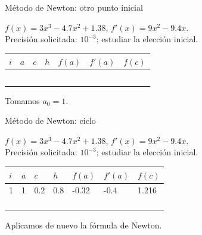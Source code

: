 \documentclass[main.tex]{subfiles}
\begin{document}
\begin{frame}[t]{Método de Newton: otro punto inicial}
\begin{minipage}[t][17mm]{\textwidth}\small
$f(x)=3x^3-4.7x^2+1.38$, $f'(x)=9x^2-9.4x$.\\
Precisión solicitada: $10^{-3}$; estudiar la elección inicial.
\end{minipage}\begingroup\scriptsize\setlength{\tabcolsep}{2pt}
\begin{center}\begin{tabular}{|C{.04\textwidth}|*{6}{C{.135\textwidth}|}}\hline
$i$&$a$&$c$&$h$&$f(a)$&$f'(a)$&$f(c)$\\\hline
\rule{0pt}{5mm}&&&&&&\\\hline
\rule{0pt}{5mm}&&&&&&\\\hline
\rule{0pt}{5mm}&&&&&&\\\hline
\rule{0pt}{5mm}&&&&&&\\\hline
\rule{0pt}{5mm}&&&&&&\\\hline
\end{tabular}\end{center}\endgroup\small Tomamos $a_0=1$.
\end{frame}
\begin{frame}[t]{Método de Newton: ciclo}
\begin{minipage}[t][17mm]{\textwidth}\small
$f(x)=3x^3-4.7x^2+1.38$, $f'(x)=9x^2-9.4x$.\\
Precisión solicitada: $10^{-3}$; estudiar la elección inicial.
\end{minipage}\begingroup\scriptsize\setlength{\tabcolsep}{2pt}
\begin{center}\begin{tabular}{|C{.04\textwidth}|*{6}{C{.135\textwidth}|}}\hline
$i$&$a$&$c$&$h$&$f(a)$&$f'(a)$&$f(c)$\\\hline
\rule{0pt}{5mm}1&1&0.2&0.8&-0.32&-0.4&1.216\\\hline
\rule{0pt}{5mm}&&&&&&\\\hline
\rule{0pt}{5mm}&&&&&&\\\hline
\rule{0pt}{5mm}&&&&&&\\\hline
\rule{0pt}{5mm}&&&&&&\\\hline
\end{tabular}\end{center}\endgroup\small Aplicamos de nuevo la fórmula de Newton.
\end{frame}
\end{document}
